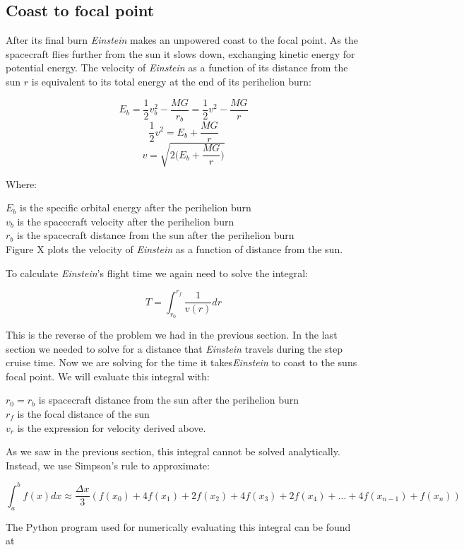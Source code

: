 \documentclass[12pt]{article} %
\begin{document}
\subsection{Coast to focal point}
After its final burn \textit{Einstein} makes an unpowered coast to the focal point. As the spacecraft flies further from the sun it slows down, exchanging kinetic energy for potential energy. The velocity of \textit{Einstein} as a function of its distance from the sun $r$ is equivalent to its total energy at the end of its perihelion burn:

$$E_{b} = \frac{1}{2}v_b^2 - \frac{MG}{r_b} = \frac{1}{2}v^2-\frac{MG}{r}$$
$$\frac{1}{2}v^2 = E_b+\frac{MG}{r}$$
$$\boxed{v = \sqrt{2\big(E_b + \frac{MG}{r}\big)}}$$

Where:

$E_b$ is the specific orbital energy after the perihelion burn\\
$v_b$ is the spacecraft velocity after the perihelion burn\\
$r_b$ is the spacecraft distance from the sun after the perihelion burn\\

Figure X plots the velocity of \textit{Einstein} as a function of distance from the sun.

To calculate \textit{Einstein}'s flight time we again need to solve the integral:

$$T = \int_{r_0}^{r_f} \frac{1}{v(r)} dr$$

This is the reverse of the problem we had in the previous section. In the last section we needed to solve for a distance that \textit{Einstein} travels during the step cruise time. Now we are solving for the time it takes\textit{Einstein} to coast to the suns focal point. We will evaluate this integral with:

$r_0 = r_b$ is spacecraft distance from the sun after the perihelion burn\\
$r_f$ is the focal distance of the sun\\
$v_r$ is the expression for velocity derived above.

As we saw in the previous section, this integral cannot be solved analytically. Instead, we use Simpson's rule to approximate:

$$\int_a^b f(x) dx \approx \frac{\Delta x}{3} (f(x_0) + 4f(x_1)+ 2f(x_2) + 4f(x_3) + 2 f(x_4) + ... + 4f(x_{n-1}) + f(x_n))$$

The Python program used for numerically evaluating this integral can be found at 
\end{document}
